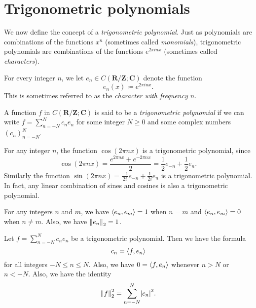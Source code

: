\section{Trigonometric polynomials}\label{sec 5.3}

\begin{note}
    We now define the concept of a \emph{trigonometric polynomial}.
    Just as polynomials are combinations of the functions \(x^n\) (sometimes called \emph{monomials}), trigonometric polynomials are combinations of the functions \(e^{2 \pi i n x}\) (sometimes called \emph{characters}).
\end{note}

\begin{definition}[Characters]\label{5.3.1}
    For every integer \(n\), we let \(e_n \in C(\mathbf{R} / \mathbf{Z} ; \mathbf{C})\) denote the function
    \[
        e_n(x) \coloneqq e^{2 \pi i n x}.
    \]
    This is sometimes referred to as the \emph{character with frequency \(n\)}.
\end{definition}

\begin{definition}\label{5.3.2}
    A function \(f\) in \(C(\mathbf{R} / \mathbf{Z} ; \mathbf{C})\) is said to be a \emph{trigonometric polynomial} if we can write
    \(f = \sum_{n = -N}^N c_n e_n\) for some integer \(N \geq 0\) and some complex numbers \((c_n)_{n = -N}^N\).
\end{definition}

\setcounter{theorem}{3}
\begin{example}\label{5.3.4}
    For any integer \(n\), the function \(\cos(2 \pi n x)\) is a trigonometric polynomial, since
    \[
        \cos(2 \pi n x) = \frac{e^{2 \pi n x} + e^{- 2 \pi n x}}{2} = \frac{1}{2} e_{-n} + \frac{1}{2} e_n.
    \]
    Similarly the function \(\sin(2 \pi n x) = \frac{-1}{2i} e_{-n} + \frac{1}{2i} e_n\) is a trigonometric polynomial.
    In fact, any linear combination of sines and cosines is also a trigonometric polynomial.
\end{example}

\begin{lemma}\label{5.3.5}
    For any integers \(n\) and \(m\), we have \(\inner*{e_n, e_m} = 1\) when \(n = m\) and \(\inner*{e_n, e_m} = 0\) when \(n \neq m\).
    Also, we have \(\norm*{e_n}_2 = 1\).
\end{lemma}

\begin{corollary}\label{5.3.6}
    Let \(f = \sum_{n = -N}^N c_n e_n\) be a trigonometric polynomial.
    Then we have the formula
    \[
        c_n = \inner*{f, e_n}
    \]
    for all integers \(-N \leq n \leq N\).
    Also, we have \(0 = \inner*{f, e_n}\) whenever \(n > N\) or \(n < -N\).
    Also, we have the identity
    \[
        \norm*{f}_2^2 = \sum_{n = -N}^N \abs*{c_n}^2.
    \]
\end{corollary}

